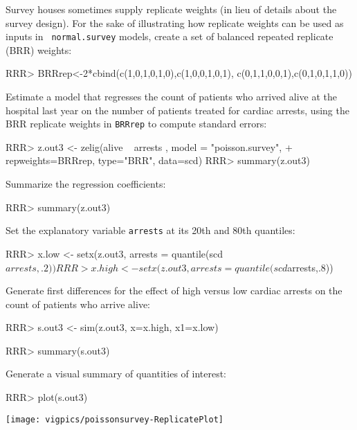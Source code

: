 \begin{enumerate}
Survey houses sometimes supply
replicate weights (in lieu of details about the survey design).  For the sake
of illustrating how replicate weights can be used as inputs in {\tt
normal.survey} models, create a set of balanced repeated replicate
(BRR) weights: 
\begin{Schunk}
\begin{Sinput}
RRR> BRRrep<-2*cbind(c(1,0,1,0,1,0),c(1,0,0,1,0,1), c(0,1,1,0,0,1),c(0,1,0,1,1,0)) 
\end{Sinput}
\end{Schunk}
Estimate a model that regresses the count of patients who arrived alive at
the hospital last year on the number of patients treated for cardiac arrests, using
the BRR replicate weights in {\tt BRRrep} to compute standard errors:
\begin{Schunk}
\begin{Sinput}
RRR> z.out3 <- zelig(alive ~ arrests , model = "poisson.survey",
+ repweights=BRRrep, type="BRR", data=scd)
RRR> summary(z.out3) 
\end{Sinput}
\end{Schunk}
Summarize the regression coefficients: 
\begin{Schunk}
\begin{Sinput}
RRR>  summary(z.out3)
\end{Sinput}
\end{Schunk}
Set the explanatory variable {\tt arrests} at its 20th and 80th quantiles:
\begin{Schunk}
\begin{Sinput}
RRR> x.low <- setx(z.out3, arrests = quantile(scd$arrests, .2))
RRR> x.high <- setx(z.out3, arrests = quantile(scd$arrests,.8)) 
\end{Sinput}
\end{Schunk}
Generate first
differences for the effect of high versus low cardiac arrests
on the count of patients who arrive alive:
\begin{Schunk}
\begin{Sinput}
RRR> s.out3 <- sim(z.out3, x=x.high, x1=x.low)
\end{Sinput}
\end{Schunk}
\begin{Schunk}
\begin{Sinput}
RRR>  summary(s.out3)
\end{Sinput}
\end{Schunk}
Generate a visual summary of quantities of interest:
\begin{center}
\begin{Schunk}
\begin{Sinput}
RRR>  plot(s.out3)
\end{Sinput}
\end{Schunk}
\texttt{[image: vigpics/poissonsurvey-ReplicatePlot]}
\end{center}


\end{enumerate}

